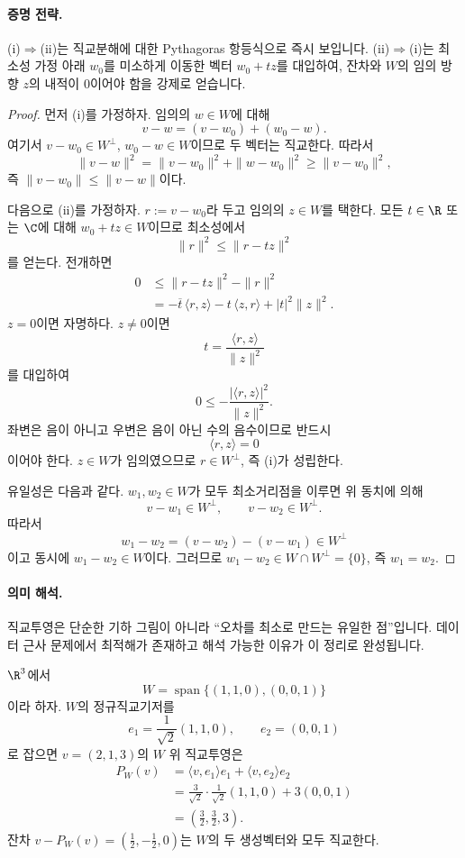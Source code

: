 \paragraph{증명 전략.}
(i)$\Rightarrow$(ii)는 직교분해에 대한 Pythagoras 항등식으로 즉시 보입니다. (ii)$\Rightarrow$(i)는 최소성 가정 아래 $w_0$를 미소하게 이동한 벡터 $w_0+tz$를 대입하여, 잔차와 $W$의 임의 방향 $z$의 내적이 0이어야 함을 강제로 얻습니다.

\begin{proof}
먼저 (i)를 가정하자. 임의의 $w\in W$에 대해
$$
v-w=(v-w_0)+(w_0-w).
$$
여기서 $v-w_0\in W^\perp$, $w_0-w\in W$이므로 두 벡터는 직교한다. 따라서
$$
\|v-w\|^2=\|v-w_0\|^2+\|w-w_0\|^2\ge \|v-w_0\|^2,
$$
즉 $\|v-w_0\|\le\|v-w\|$이다.

다음으로 (ii)를 가정하자. $r:=v-w_0$라 두고 임의의 $z\in W$를 택한다. 모든 $t\in\R$ 또는 $\C$에 대해 $w_0+tz\in W$이므로 최소성에서
$$
\|r\|^2\le \|r-tz\|^2
$$
를 얻는다. 전개하면
\begin{align*}
0&\le \|r-tz\|^2-\|r\|^2\\
&= -\overline t\,\langle r,z\rangle - t\,\langle z,r\rangle + |t|^2\|z\|^2.
\end{align*}
$z=0$이면 자명하다. $z\ne0$이면
$$
t=\frac{\langle r,z\rangle}{\|z\|^2}
$$
를 대입하여
$$
0\le -\frac{|\langle r,z\rangle|^2}{\|z\|^2}.
$$
좌변은 음이 아니고 우변은 음이 아닌 수의 음수이므로 반드시
$$
\langle r,z\rangle=0
$$
이어야 한다. $z\in W$가 임의였으므로 $r\in W^\perp$, 즉 (i)가 성립한다.

유일성은 다음과 같다. $w_1,w_2\in W$가 모두 최소거리점을 이루면 위 동치에 의해
$$
v-w_1\in W^\perp,\qquad v-w_2\in W^\perp.
$$
따라서
$$
w_1-w_2=(v-w_2)-(v-w_1)\in W^\perp
$$
이고 동시에 $w_1-w_2\in W$이다. 그러므로 $w_1-w_2\in W\cap W^\perp=\{0\}$, 즉 $w_1=w_2$.
\end{proof}

\paragraph{의미 해석.}
직교투영은 단순한 기하 그림이 아니라 ``오차를 최소로 만드는 유일한 점''입니다. 데이터 근사 문제에서 최적해가 존재하고 해석 가능한 이유가 이 정리로 완성됩니다.

\begin{example}
$\R^3$에서
$$
W=\operatorname{span}\{(1,1,0),(0,0,1)\}
$$
이라 하자. $W$의 정규직교기저를
$$
e_1=\frac1{\sqrt2}(1,1,0),\qquad e_2=(0,0,1)
$$
로 잡으면 $v=(2,1,3)$의 $W$ 위 직교투영은
\begin{align*}
P_W(v)
&=\langle v,e_1\rangle e_1+\langle v,e_2\rangle e_2\\
&=\frac3{\sqrt2}\cdot\frac1{\sqrt2}(1,1,0)+3(0,0,1)\\
&=\left(\frac32,\frac32,3\right).
\end{align*}
잔차 $v-P_W(v)=\left(\frac12,-\frac12,0\right)$는 $W$의 두 생성벡터와 모두 직교한다.
\end{example}

